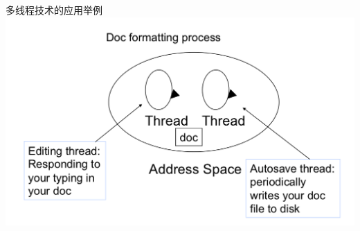 \documentclass[xcolor=svgnames]{beamer}
\begin{document}
\begin{CJK*}{UTF8}{gbsn}
\begin{frame}{多线程技术的应用举例}
\includegraphics[width=1.0\textwidth]{thread.png}
\end{frame}

\end{CJK*}
\end{document}
